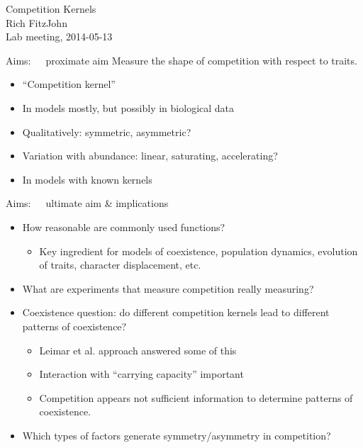 \documentclass[12pt]{beamer}
\begin{document}
\begin{frame}
  \thispagestyle{empty}
  \begin{center}
    \sf
    {\Huge Competition Kernels}\\[2ex]
    {\large Rich FitzJohn}\\[3em]
    {Lab meeting, 2014-05-13}
  \end{center}
\end{frame}

\begin{frame}[t]{Aims:~~~proximate aim}
 Measure the shape of competition with respect to traits.
 \begin{itemize}
 \item ``Competition kernel''
 \item In models mostly, but possibly in biological data
 \item Qualitatively: symmetric, asymmetric?
 \item Variation with abundance: linear, saturating, accelerating?
 \item In models with known kernels
 \end{itemize}
\end{frame}

\begin{frame}[t]{Aims:~~~ultimate aim \& implications}
 \begin{itemize}
 \item How reasonable are commonly used
   functions?
   \begin{itemize}
   \item Key ingredient for models of coexistence, population
     dynamics, evolution of traits, character displacement, etc.
   \end{itemize}
 \item What are experiments that measure competition really
   measuring?
 \item Coexistence question: do different competition kernels lead
   to different patterns of coexistence?
   \begin{itemize}
   \item Leimar et al. approach answered some of this
   \item Interaction with ``carrying capacity'' important
   \item Competition appears not sufficient information to determine
     patterns of coexistence.
   \end{itemize}
 \item Which types of factors generate symmetry/asymmetry in
   competition?
 \end{itemize}
\end{frame}
\end{document}

